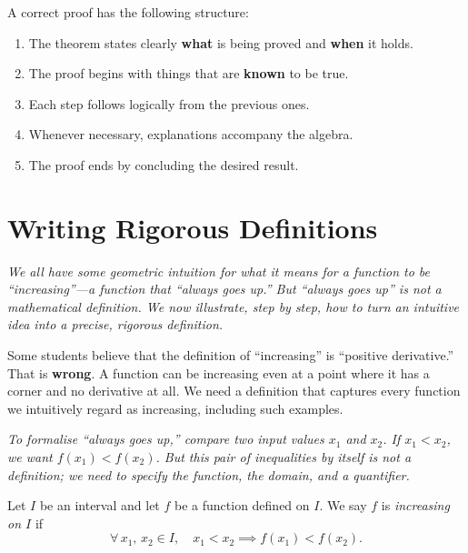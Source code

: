 \begin{remark}
A correct proof has the following structure:
\begin{enumerate}[label=(\arabic*)]
  \item The theorem states clearly \textbf{what} is being proved and \textbf{when} it holds.
  \item The proof begins with things that are \textbf{known} to be true.
  \item Each step follows logically from the previous ones.
  \item Whenever necessary, explanations accompany the algebra.
  \item The proof ends by concluding the desired result.
\end{enumerate}
\end{remark}

\section{Writing Rigorous Definitions}
\label{sec:1.10}

\textit{We all have some geometric intuition for what it means for a function to be ``increasing''---a function that ``always goes up.''  But ``always goes up'' is not a mathematical definition.  We now illustrate, step by step, how to turn an intuitive idea into a precise, rigorous definition.}

\begin{remark}[Warning]
Some students believe that the definition of ``increasing'' is ``positive derivative.''  That is \textbf{wrong}.  A function can be increasing even at a point where it has a corner and no derivative at all.  We need a definition that captures every function we intuitively regard as increasing, including such examples.
\end{remark}

\textit{To formalise ``always goes up,'' compare two input values $x_{1}$ and $x_{2}$.  If $x_{1} < x_{2}$, we want $f(x_{1}) < f(x_{2})$.  But this pair of inequalities by itself is not a definition; we need to specify the function, the domain, and a quantifier.}

\begin{definition}
\label{def:1-11}
Let $I$ be an interval and let $f$ be a function defined on $I$.  We say $f$ is \emph{increasing on $I$} if
\[
  \forall\, x_{1},\, x_{2} \in I, \quad x_{1} < x_{2} \implies f(x_{1}) < f(x_{2}).
\]
\end{definition}

